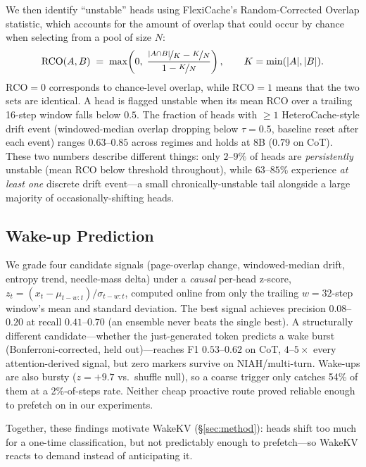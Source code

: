 \documentclass{article}
\begin{document}
We then identify ``unstable'' heads using FlexiCache's Random-Corrected
Overlap statistic, which accounts for the amount of overlap that could occur
by chance when selecting from a pool of size $N$:
\begin{equation}
\mathrm{RCO}(A,B) \;=\; \max\!\left(0,\; \frac{\nicefrac{|A\cap B|}{K} - \nicefrac{K}{N}}{1 - \nicefrac{K}{N}}\right), \qquad K = \min(|A|,|B|).
\label{eq:rco}
\end{equation}
$\mathrm{RCO}=0$ corresponds to chance-level overlap, while $\mathrm{RCO}=1$ means that the two sets are identical.  A head is flagged unstable when its mean RCO
over a trailing 16-step window falls below $0.5$. The fraction of heads
with $\geq 1$ HeteroCache-style drift event (windowed-median overlap
dropping below $\tau{=}0.5$, baseline reset after each event) ranges
$0.63$--$0.85$ across regimes and holds at 8B ($0.79$ on CoT). These
two numbers describe different things: only $2$--$9\%$ of heads are
\emph{persistently} unstable (mean RCO below threshold throughout),
while $63$--$85\%$ experience \emph{at least one} discrete drift
event---a small chronically-unstable tail alongside a large majority
of occasionally-shifting heads.

\subsection{Wake-up Prediction}

We grade four candidate signals (page-overlap change, windowed-median
drift, entropy trend, needle-mass delta) under a \emph{causal} per-head
z-score, $z_t = (x_t - \mu_{t-w:t}) / \sigma_{t-w:t}$, computed online
from only the trailing $w{=}32$-step window's mean and standard
deviation. The best signal achieves precision $0.08$--$0.20$ at recall
$0.41$--$0.70$ (an ensemble never beats the single best). A
structurally different candidate---whether the just-generated token
predicts a wake burst (Bonferroni-corrected, held out)---reaches F1
$0.53$--$0.62$ on CoT, $4$--$5\times$ every attention-derived signal,
but zero markers survive on NIAH/multi-turn. Wake-ups are also bursty
($z=+9.7$ vs.\ shuffle null), so a coarse trigger only catches 54\% of
them at a 2\%-of-steps rate. Neither cheap proactive route proved
reliable enough to prefetch on in our experiments.

Together, these findings motivate WakeKV (\S\ref{sec:method}): heads
shift too much for a one-time classification, but not predictably
enough to prefetch---so WakeKV reacts to demand instead of anticipating
it.
\end{document}
